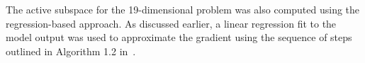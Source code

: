 
The active subspace for the 19-dimensional problem was also computed using the regression-based
approach. As discussed earlier, a linear regression fit to the model output was used to
approximate the gradient using the sequence of steps outlined in Algorithm 1.2 
in~\cite{Constantine:2015}. 
%
%
%
